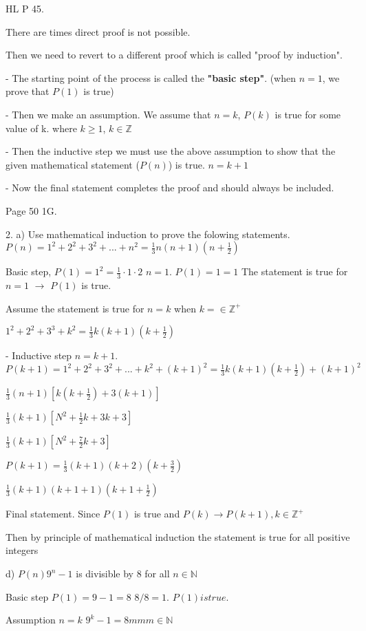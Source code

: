 
HL P 45.

There are times direct proof is not possible.

Then we need to revert to a different proof which is called "proof by induction".

- The starting point of the process is called the \textbf{"basic step"}. (when $n=1$, we prove that $P(1)$ is true)

- Then we make an assumption. We assume that $n=k$, $P(k)$ is true for some value of k. where $k\geq 1$, $k\in\mathbb{Z}$

- Then the inductive step we must use the above assumption to show that the given mathematical statement ($P(n)$) is true. $n=k+1$

- Now the final statement completes the proof and should always be included.

Page 50 1G.

2. a) Use mathematical induction to prove the folowing statements.
$P(n)=1^2+2^2+3^2+...+n^2=\frac{1}{3}n(n+1)(n+\frac{1}{2})$

Basic step, $P(1)=1^2=\frac{1}{3}\cdot1\cdot2$ $n=1$.
$P(1)=1=1$
The statement is true for $n=1$ $\rightarrow$ $P(1)$ is true.

Assume the statement is true for $n=k$ when $k=\in\mathbb{Z}^+$

$1^2+2^2+3^3+k^2=\frac{1}{3}k(k+1)(k+\frac{1}{2})$

- Inductive step $n=k+1$.
$P(k+1)=1^2+2^2+3^2+...+k^2+(k+1)^2=\frac{1}{3}k(k+1)(k+\frac{1}{2})+(k+1)^2$

$\frac{1}{3}(n+1)[k(k+\frac{1}{2})+3(k+1)]$

$\frac{1}{3}(k+1)[N^2+\frac{1}{2}k+3k+3]$

$\frac{1}{3}(k+1)[N^2+\frac{7}{2}k+3]$

$P(k+1)=\frac{1}{3}(k+1)(k+2)(k+\frac{3}{2})$

$\frac{1}{3}(k+1)(k+1+1)(k+1+\frac{1}{2})$

Final statement.
Since $P(1)$ is true and $P(k)\rightarrow P(k+1), k\in\mathbb{Z}^+$

Then by principle of mathematical induction the statement is true for all positive integers

d) $P(n) 9^n-1$ is divisible by 8 for all $n\in\mathbb{N}$

Basic step $P(1)=9-1=8$ $8/8=1$.
$P(1) is true.$

Assumption $n=k$ $9^k-1=8mm m\in\mathbb{N}$

